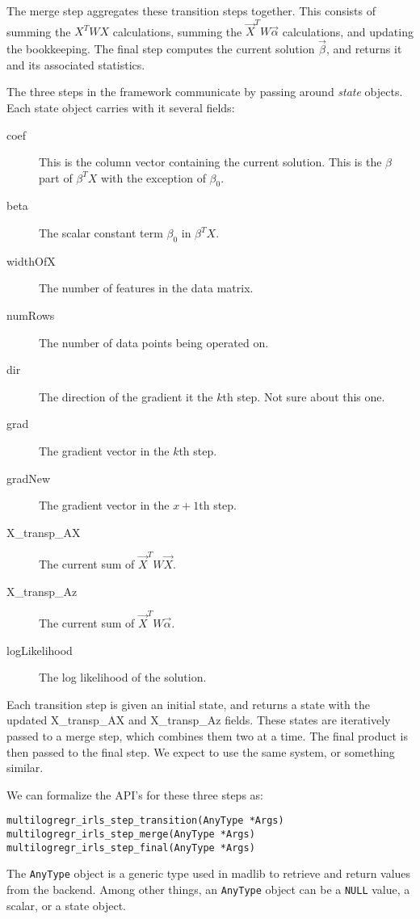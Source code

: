 \documentclass[12pt]{article}
\begin{document}
The merge step aggregates these transition steps together.  This consists of summing the $X^T WX$ calculations, summing the $\vec{X}^TW\vec{\alpha}$ calculations, and updating the bookkeeping.   The final step computes the current solution $\vec{\beta}$, and returns it and its associated statistics.  

The three steps in the framework communicate by passing around \textit{state} objects.  Each state object carries with it several fields:  
\begin{description}
\item [coef] This is the column vector containing the current solution.  This is the $\beta$ part of $\beta^TX$ with the exception of $\beta_0$.
\item [beta] The scalar constant term $\beta_0$ in $\beta^TX$.
\item [widthOfX] The number of features in the data matrix.  
\item [numRows] The number of data points being operated on.  
\item [dir] The direction of the gradient it the $k$th step.  Not sure about this one.  
\item [grad] The gradient vector in the $k$th step.
\item [gradNew] The gradient vector in the $x+1$th step.  
\item [X\_transp\_AX] The current sum of $\vec{X}^T W\vec{X}$.   
\item [X\_transp\_Az] The current sum of $\vec{X}^TW\vec{\alpha}$.
\item [logLikelihood] The log likelihood  of the solution.  
\end{description}

Each transition step is given an initial state, and returns a state with the updated X\_transp\_AX and X\_transp\_Az fields.  These states are iteratively passed to a merge step, which combines them two at a time.  The final product is then passed to the final step.  We expect to use the same system, or something similar.  

We can formalize the API's for these three steps as:
\begin{verbatim}
multilogregr_irls_step_transition(AnyType *Args)
multilogregr_irls_step_merge(AnyType *Args)
multilogregr_irls_step_final(AnyType *Args)
\end{verbatim}
The \texttt{AnyType} object is a generic type used in  madlib to retrieve and return values from the backend.  Among other things, an  \texttt{AnyType} object can be a \texttt{NULL} value, a scalar, or a state object.  
\end{document}
